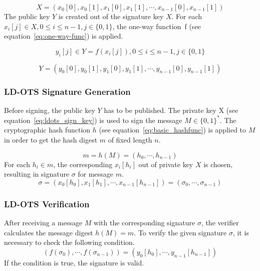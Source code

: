 \begin{equation}
\label{eq:ldots_sign_key}
X = \left(x_{0}\left[0\right], x_{0}\left[1\right], x_{1}\left[0\right], x_{1}\left[1\right], \cdots, x_{n-1}\left[0\right], x_{n-1}\left[1\right] \right)
\end{equation}
The public key $Y$ is created out of the signature key $X$. For each $x_i[j] \in X, 0 \leq i \leq n-1, j \in \lbrace 0,1 \rbrace$, the one-way function~f (see equation~\ref{eq:one-way-func}) is applied.

\begin{equation}
y_i[j] \in Y = f(x_i[j]), 0 \leq i \leq n-1, j \in \lbrace 0,1 \rbrace
\end{equation}

\begin{equation}
Y = \left( 
y_{0}\left[0\right], y_{0}\left[1 \right], y_{1}\left[0\right], y_{1}\left[1\right], \cdots, y_{n-1}\left[0\right], y_{n-1}\left[1\right]
\right)
\end{equation}

\subsubsection{LD-OTS Signature Generation} %
Before signing, the public key $Y$ has to be published.
The private key X (see equation~\ref{eq:ldots_sign_key}) is used to sign the message $M \in \lbrace 0,1 \rbrace^*$. 
The cryptographic hash function $h$ (see equation~\ref{eq:basic_hashfunc}) is applied to $M$ in order to get the hash digest $m$ of fixed length $n$.

\begin{equation}
\label{eq:hash_message}
m = h(M) = (h_{0}, \cdots, h_{n-1})
\end{equation} %
For each $h_i \in m$, the corresponding $x_i[h_i]$ out of private key $X$ is chosen, resulting in signature $\sigma$ for message $m$.
\begin{equation}
\sigma = \left(
x_0 \left[ h_0 \right], x_1\left[ h_1 \right], \cdots, x_{n-1}\left[ h_{n-1}\right]
\right) = (\sigma_0, \cdots, \sigma_{n-1})
\end{equation}

\subsubsection{LD-OTS Verification}
After receiving a message $M$ with the corresponding signature $\sigma$, the verifier calculates the message digest $h(M) = m$. 
To verify the given signature $\sigma$, it is necessary to check the following condition.
\begin{equation}
\left(
f(\sigma_0), \cdots, f(\sigma_{n-1})
\right) =
\left(
y_0[h_0], \cdots, y_{n-1}[h_{n-1}]
\right)
\end{equation}
If the condition is true, the signature is valid.

